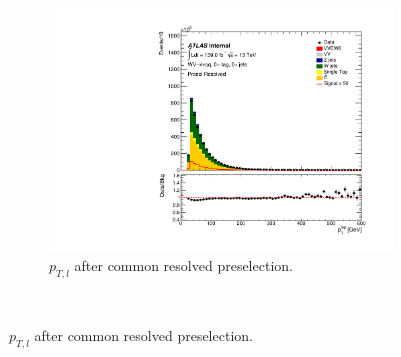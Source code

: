 \begin{figure}[ht]
\begin{subfigure}{0.32\textwidth}
            \includegraphics[width=\linewidth]{figures/event_selection/Presel_Resolved_PtL.pdf}
            \caption{$p_{T,l}$ after common resolved preselection.}
        \end{subfigure} \\


\end{figure}
